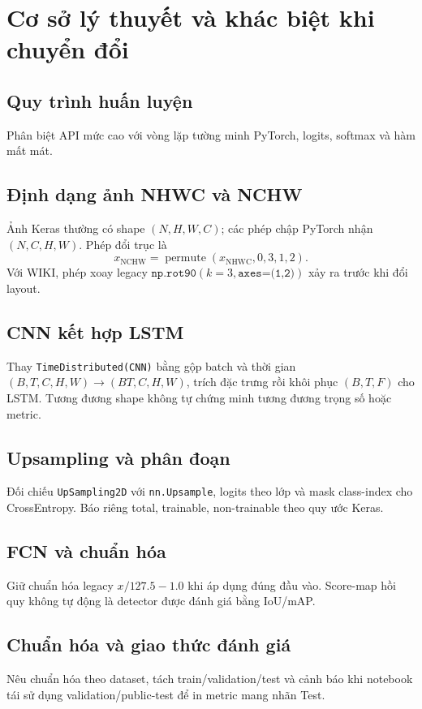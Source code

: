 \chapter{Cơ sở lý thuyết và khác biệt khi chuyển đổi}
\section{Quy trình huấn luyện}
Phân biệt API mức cao với vòng lặp tường minh PyTorch, logits, softmax và hàm mất mát.

\section{Định dạng ảnh NHWC và NCHW}
Ảnh Keras thường có shape $(N,H,W,C)$; các phép chập PyTorch nhận $(N,C,H,W)$. Phép đổi trục là
\[
x_{\mathrm{NCHW}}=\operatorname{permute}(x_{\mathrm{NHWC}},0,3,1,2).
\]
Với WIKI, phép xoay legacy $\texttt{np.rot90}(k=3,\texttt{axes=(1,2)})$ xảy ra trước khi đổi layout.

\section{CNN kết hợp LSTM}
Thay \texttt{TimeDistributed(CNN)} bằng gộp batch và thời gian $(B,T,C,H,W)\to(BT,C,H,W)$, trích đặc trưng rồi khôi phục $(B,T,F)$ cho LSTM. Tương đương shape không tự chứng minh tương đương trọng số hoặc metric.

\section{Upsampling và phân đoạn}
Đối chiếu \texttt{UpSampling2D} với \texttt{nn.Upsample}, logits theo lớp và mask class-index cho CrossEntropy. Báo riêng total, trainable, non-trainable theo quy ước Keras.

\section{FCN và chuẩn hóa}
Giữ chuẩn hóa legacy $x/127.5-1.0$ khi áp dụng đúng đầu vào. Score-map hồi quy không tự động là detector được đánh giá bằng IoU/mAP.

\section{Chuẩn hóa và giao thức đánh giá}
Nêu chuẩn hóa theo dataset, tách train/validation/test và cảnh báo khi notebook tái sử dụng validation/public-test để in metric mang nhãn Test.